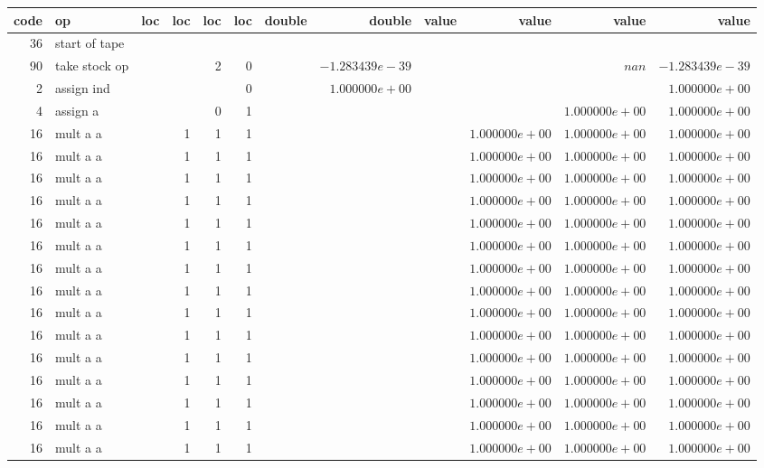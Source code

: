 \documentclass{article}
\begin{document}
\tiny
\begin{tabular}{|r|l|r|r|r|r||r|r||r|r|r|r|} \hline 
 code & op & loc & loc & loc & loc & double & double & value & value & value & value \\ \hline 
 36 & start of tape & & & & & & & & & &  \\ \hline 
90 & take stock op & & & 2 & 0 & &$ -1.283439e-39 $& & &$ nan $&$ -1.283439e-39 $\\ \hline 
2 & assign ind & & & & 0 & &$ 1.000000e+00 $& & & &$ 1.000000e+00 $\\ \hline 
4 & assign a & & & 0 & 1 & & & & &$ 1.000000e+00 $&$ 1.000000e+00 $\\ \hline 
16 & mult a a & & 1 & 1 & 1 & & & &$ 1.000000e+00 $&$ 1.000000e+00 $&$ 1.000000e+00 $\\ \hline 
16 & mult a a & & 1 & 1 & 1 & & & &$ 1.000000e+00 $&$ 1.000000e+00 $&$ 1.000000e+00 $\\ \hline 
16 & mult a a & & 1 & 1 & 1 & & & &$ 1.000000e+00 $&$ 1.000000e+00 $&$ 1.000000e+00 $\\ \hline 
16 & mult a a & & 1 & 1 & 1 & & & &$ 1.000000e+00 $&$ 1.000000e+00 $&$ 1.000000e+00 $\\ \hline 
16 & mult a a & & 1 & 1 & 1 & & & &$ 1.000000e+00 $&$ 1.000000e+00 $&$ 1.000000e+00 $\\ \hline 
16 & mult a a & & 1 & 1 & 1 & & & &$ 1.000000e+00 $&$ 1.000000e+00 $&$ 1.000000e+00 $\\ \hline 
16 & mult a a & & 1 & 1 & 1 & & & &$ 1.000000e+00 $&$ 1.000000e+00 $&$ 1.000000e+00 $\\ \hline 
16 & mult a a & & 1 & 1 & 1 & & & &$ 1.000000e+00 $&$ 1.000000e+00 $&$ 1.000000e+00 $\\ \hline 
16 & mult a a & & 1 & 1 & 1 & & & &$ 1.000000e+00 $&$ 1.000000e+00 $&$ 1.000000e+00 $\\ \hline 
16 & mult a a & & 1 & 1 & 1 & & & &$ 1.000000e+00 $&$ 1.000000e+00 $&$ 1.000000e+00 $\\ \hline 
16 & mult a a & & 1 & 1 & 1 & & & &$ 1.000000e+00 $&$ 1.000000e+00 $&$ 1.000000e+00 $\\ \hline 
16 & mult a a & & 1 & 1 & 1 & & & &$ 1.000000e+00 $&$ 1.000000e+00 $&$ 1.000000e+00 $\\ \hline 
16 & mult a a & & 1 & 1 & 1 & & & &$ 1.000000e+00 $&$ 1.000000e+00 $&$ 1.000000e+00 $\\ \hline 
16 & mult a a & & 1 & 1 & 1 & & & &$ 1.000000e+00 $&$ 1.000000e+00 $&$ 1.000000e+00 $\\ \hline 
16 & mult a a & & 1 & 1 & 1 & & & &$ 1.000000e+00 $&$ 1.000000e+00 $&$ 1.000000e+00 $\\ \hline 

\end{tabular}
\end{document}
